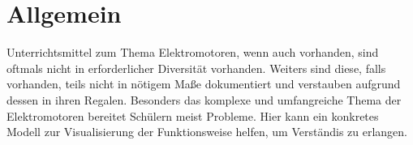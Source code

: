 \section{Allgemein}

Unterrichtsmittel zum Thema Elektromotoren, wenn auch vorhanden, sind oftmals nicht in erforderlicher Diversität vorhanden.
Weiters sind diese, falls vorhanden, teils nicht in nötigem Maße dokumentiert und verstauben aufgrund dessen in ihren Regalen.
Besonders das komplexe und umfangreiche Thema der Elektromotoren bereitet Schülern meist Probleme.
Hier kann ein konkretes Modell zur Visualisierung der Funktionsweise helfen, um Verständis zu erlangen.